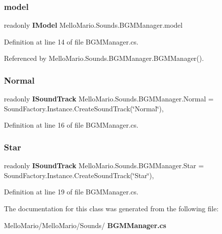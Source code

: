 \subsubsection{model}
{\footnotesize\ttfamily readonly \textbf{ I\+Model} Mello\+Mario.\+Sounds.\+B\+G\+M\+Manager.\+model\hspace{0.3cm}{\ttfamily [private]}}



Definition at line 14 of file B\+G\+M\+Manager.\+cs.



Referenced by Mello\+Mario.\+Sounds.\+B\+G\+M\+Manager.\+B\+G\+M\+Manager().

\mbox{\label{classMelloMario_1_1Sounds_1_1BGMManager_a98be4428e6397691e40f30f166827adc}} 
\subsubsection{Normal}
{\footnotesize\ttfamily readonly \textbf{ I\+Sound\+Track} Mello\+Mario.\+Sounds.\+B\+G\+M\+Manager.\+Normal = Sound\+Factory.\+Instance.\+Create\+Sound\+Track(\char`\"{}Normal\char`\"{})\hspace{0.3cm}{\ttfamily [static]}, {\ttfamily [private]}}



Definition at line 16 of file B\+G\+M\+Manager.\+cs.

\mbox{\label{classMelloMario_1_1Sounds_1_1BGMManager_a156b2e450a8bad9f76df404f433208e6}} 
\subsubsection{Star}
{\footnotesize\ttfamily readonly \textbf{ I\+Sound\+Track} Mello\+Mario.\+Sounds.\+B\+G\+M\+Manager.\+Star = Sound\+Factory.\+Instance.\+Create\+Sound\+Track(\char`\"{}Star\char`\"{})\hspace{0.3cm}{\ttfamily [static]}, {\ttfamily [private]}}



Definition at line 19 of file B\+G\+M\+Manager.\+cs.



The documentation for this class was generated from the following file\+:\begin{DoxyCompactItemize}
\item 
Mello\+Mario/\+Mello\+Mario/\+Sounds/\textbf{ B\+G\+M\+Manager.\+cs}\end{DoxyCompactItemize}
